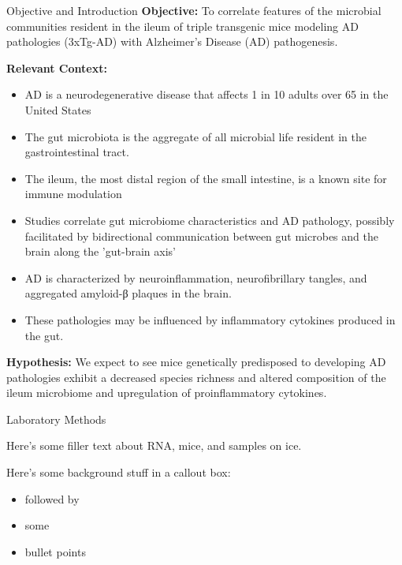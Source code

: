 \documentclass[final]{beamer}
\newlength{\colwidth}
\begin{document}
\begin{frame}[t]
\begin{columns}[t]
\begin{column}{\colwidth}
\begin{block}{Objective and Introduction}
    \textbf{Objective:} To correlate features of the microbial communities
    resident in the ileum of triple transgenic mice modeling AD pathologies
    (3xTg-AD) with Alzheimer's Disease (AD) pathogenesis.

    \textbf{Relevant Context:}
    \begin{itemize}
      \item AD is a neurodegenerative disease that affects 1 in 10 adults over 65 in the United States
      \item The gut microbiota is the aggregate of all microbial life resident in the gastrointestinal tract.
      \item The ileum, the most distal region of the small intestine, is a known site for immune modulation
      \item Studies correlate gut microbiome characteristics and AD pathology, possibly facilitated by bidirectional communication between gut microbes and the brain along the 'gut-brain axis'
      \item AD is characterized by neuroinflammation, neurofibrillary tangles, and aggregated amyloid-β plaques in the brain.
      \item These pathologies may be influenced by inflammatory cytokines produced in the gut.
    \end{itemize}

    \textbf{Hypothesis:}
    We expect to see mice genetically predisposed to developing AD
    pathologies exhibit a decreased species richness and altered composition
    of the ileum microbiome and upregulation of proinflammatory cytokines.
      
  \end{block}

  \begin{block}{Laboratory Methods}

    Here's some filler text about RNA, mice, and samples on ice.

   \begin{tcolorbox}
   [width=\textwidth, colframe=blue]
   {Here's some background stuff in a callout box:}
    \begin{itemize}
      \item {followed by}
      \item {some}
      \item {bullet points}
    \end{itemize}
    \end{tcolorbox}
  \end{block}


\end{column}
\end{columns}
\end{frame}
\end{document}
